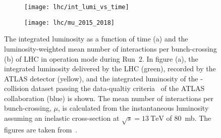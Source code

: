 
\begin{figure}[htbp]
  \centering

  \begin{subfigure}{0.47\textwidth}
    \texttt{[image: lhc/int\_lumi\_vs\_time]}
    \subcaption{}
  \end{subfigure}\hspace*{0.02\textwidth}%
  \begin{subfigure}{0.47\textwidth}
    \texttt{[image: lhc/mu\_2015\_2018]}
    \subcaption{}
  \end{subfigure}

  \caption{The integrated luminosity as a function of time (a) and the
    luminosity-weighted mean number of interactions per bunch-crossing (b) of
    LHC in \pp operation mode during Run~2. In figure (a), the integrated
    luminosity delivered by the LHC (green), recorded by the ATLAS detector
    (yellow), and the integrated luminosity of the \pp-collision dataset passing
    the data-qualtiy criteria~\cite{DAPR-2018-01} of the ATLAS collaboration
    (blue) is shown. The mean number of interactions per bunch-crossing, $\mu$,
    is calculated from the instantaneous luminosity assuming an inelastic \pp
    cross-section at $\sqrt{s} = \SI{13}{\TeV}$ of \SI{80}{\milli\barn}. The
    figures are taken from~\cite{atlas_luminosity_summary_plots}.}%
  \label{fig:lumi_and_pu}
\end{figure}

